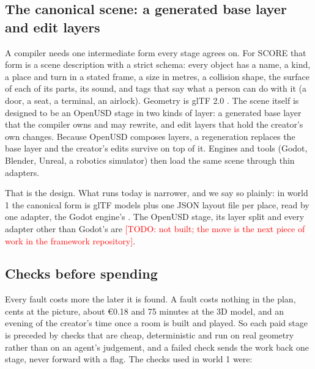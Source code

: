 \subsection{The canonical scene: a generated base layer and edit layers}\label{the-canonical-scene-a-generated-base-layer-and-edit-layers}

A compiler needs one intermediate form every stage agrees on. For SCORE that form is a scene description with a strict schema: every object has a name, a kind, a place and turn in a stated frame, a size in metres, a collision shape, the surface of each of its parts, its sound, and tags that say what a person can do with it (a door, a seat, a terminal, an airlock). Geometry is glTF 2.0 \citep{gltf2}. The scene itself is designed to be an OpenUSD stage \citep{openusd} in two kinds of layer: a generated base layer that the compiler owns and may rewrite, and edit layers that hold the creator's own changes. Because OpenUSD composes layers, a regeneration replaces the base layer and the creator's edits survive on top of it. Engines and tools (Godot, Blender, Unreal, a robotics simulator) then load the same scene through thin adapters.

That is the design. What runs today is narrower, and we say so plainly: in world 1 the canonical form is glTF models plus one JSON layout file per place, read by one adapter, the Godot engine's \citep{godot}. The OpenUSD stage, its layer split and every adapter other than Godot's are \textcolor{red}{[TODO: not built; the move is the next piece of work in the framework repository]}.

\subsection{Checks before spending}\label{checks-before-spending}

Every fault costs more the later it is found. A fault costs nothing in the plan, cents at the picture, about €0.18 and 75 minutes at the 3D model, and an evening of the creator's time once a room is built and played. So each paid stage is preceded by checks that are cheap, deterministic and run on real geometry rather than on an agent's judgement, and a failed check sends the work back one stage, never forward with a flag. The checks used in world 1 were:

